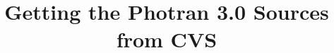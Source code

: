\documentclass[10pt,letterpaper]{article}
\begin{document}
\title{Getting the Photran 3.0 Sources from CVS}
\author{}
\date{}

\maketitle


\end{document}
